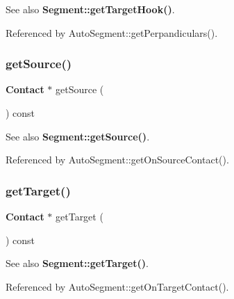 \begin{DoxySeeAlso}{See also}
\textbf{ Segment\+::get\+Target\+Hook()}. 
\end{DoxySeeAlso}


Referenced by Auto\+Segment\+::get\+Perpandiculars().

\mbox{\label{classKatabatic_1_1AutoSegment_a497ea2ceeddb939dbc84eae0e7862335}} 
\subsubsection{\texorpdfstring{get\+Source()}{getSource()}}
{\footnotesize\ttfamily \textbf{ Contact} $\ast$ get\+Source (\begin{DoxyParamCaption}{ }\end{DoxyParamCaption}) const\hspace{0.3cm}{\ttfamily [inline]}}

\begin{DoxySeeAlso}{See also}
\textbf{ Segment\+::get\+Source()}. 
\end{DoxySeeAlso}


Referenced by Auto\+Segment\+::get\+On\+Source\+Contact().

\mbox{\label{classKatabatic_1_1AutoSegment_a0862c201bd7d8e5427e44ca2427c2fe6}} 
\subsubsection{\texorpdfstring{get\+Target()}{getTarget()}}
{\footnotesize\ttfamily \textbf{ Contact} $\ast$ get\+Target (\begin{DoxyParamCaption}{ }\end{DoxyParamCaption}) const\hspace{0.3cm}{\ttfamily [inline]}}

\begin{DoxySeeAlso}{See also}
\textbf{ Segment\+::get\+Target()}. 
\end{DoxySeeAlso}


Referenced by Auto\+Segment\+::get\+On\+Target\+Contact().

